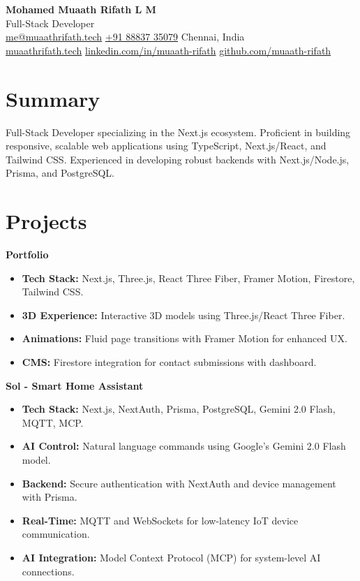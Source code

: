 \documentclass[a4paper,10pt]{article}
\newcommand{\entryTitle}[1]{\noindent\textbf{#1}}
\begin{document}
\begin{center}
    {\Large\bfseries Mohamed Muaath Rifath L M} \\
    \vspace{1pt}
    {\normalsize Full-Stack Developer} \\
    \vspace{2pt}
    \small
    \href{mailto:me@muaathrifath.tech}{me@muaathrifath.tech} \textbullet{}
    \href{tel:+918883735079}{+91 88837 35079} \textbullet{}
    Chennai, India \\
    \href{https://muaathrifath.tech}{muaathrifath.tech} \textbullet{}
    \href{https://linkedin.com/in/muaath-rifath}{linkedin.com/in/muaath-rifath} \textbullet{}
    \href{https://github.com/muaath-rifath}{github.com/muaath-rifath}
\end{center}

\section*{Summary}
\RaggedRight
Full-Stack Developer specializing in the Next.js ecosystem. Proficient in building 
responsive, scalable web applications using TypeScript, Next.js/React, and Tailwind CSS. 
Experienced in developing robust backends with Next.js/Node.js, Prisma, and PostgreSQL.
\vspace{4pt}

\section*{Projects}

\entryTitle{Portfolio}
\begin{itemize}
    \item \textbf{Tech Stack:} Next.js, Three.js, React Three Fiber, Framer Motion, Firestore, Tailwind CSS.
    \item \textbf{3D Experience:} Interactive 3D models using Three.js/React Three Fiber.
    \item \textbf{Animations:} Fluid page transitions with Framer Motion for enhanced UX.
    \item \textbf{CMS:} Firestore integration for contact submissions with dashboard.
\end{itemize}

\vspace{2pt}
\entryTitle{Sol - Smart Home Assistant}
\begin{itemize}
    \item \textbf{Tech Stack:} Next.js, NextAuth, Prisma, PostgreSQL, Gemini 2.0 Flash, MQTT, MCP.
    \item \textbf{AI Control:} Natural language commands using Google's Gemini 2.0 Flash model.
    \item \textbf{Backend:} Secure authentication with NextAuth and device management with Prisma.
    \item \textbf{Real-Time:} MQTT and WebSockets for low-latency IoT device communication.
    \item \textbf{AI Integration:} Model Context Protocol (MCP) for system-level AI connections.
\end{itemize}
\end{document}
